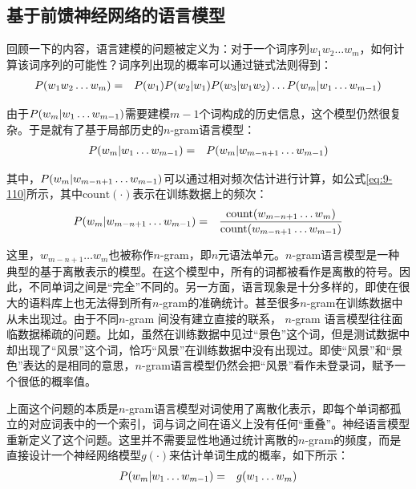 
\subsection{基于前馈神经网络的语言模型}

\parinterval  回顾一下{\chaptertwo}的内容，语言建模的问题被定义为：对于一个词序列$ w_1w_2\dots w_m$，如何计算该词序列的可能性？词序列出现的概率可以通过链式法则得到：
\begin{eqnarray}
{P}(w_1w_2\dots w_m)&=&{P}(w_1){P}(w_2|w_1){P}(w_3|w_1w_2)\dots {P}(w_m|w_1\dots w_{m-1})
\label{eq:9-57}
\end{eqnarray}

\parinterval  由于$ {P}(w_m|w_1\dots w_{m-1}) $需要建模$ m-1 $个词构成的历史信息，这个模型仍然很复杂。于是就有了基于局部历史的$n$-gram语言模型：
\begin{eqnarray}
{P}(w_m|w_1\dots w_{m-1})&=&{P}(w_m|w_{m-n+1}\dots w_{m-1})
\label{eq:9-58}
\end{eqnarray}

\noindent  其中，${P}(w_m|w_{m-n+1}\dots w_{m-1}) $可以通过相对频次估计进行计算，如公式\eqref{eq:9-110}所示，其中$ {\textrm{count}}(\cdot) $表示在训练数据上的频次：
\begin{eqnarray}
{P}(w_m|w_{m-n+1}\dots w_{m-1})&=&\frac{{\textrm{count}}(w_{m-n+1}\dots w_m)}{{\textrm{count}}(w_{m-n+1}\dots w_{m-1})}
\label{eq:9-110}
\end{eqnarray}

\noindent 这里，$ w_{m-n+1}\dots w_m $也被称作$n$-gram，即$ n $元语法单元。$n$-gram语言模型是一种典型的基于离散表示的模型。在这个模型中，所有的词都被看作是离散的符号。因此，不同单词之间是“完全”不同的。另一方面，语言现象是十分多样的，即使在很大的语料库上也无法得到所有$n$-gram的准确统计。甚至很多$n$-gram在训练数据中从未出现过。由于不同$n$-gram 间没有建立直接的联系， $n$-gram 语言模型往往面临数据稀疏的问题。比如，虽然在训练数据中见过“景色”这个词，但是测试数据中却出现了“风景”这个词，恰巧“风景”在训练数据中没有出现过。即使“风景”和“景色”表达的是相同的意思，$n$-gram语言模型仍然会把“风景”看作未登录词，赋予一个很低的概率值。

\parinterval  上面这个问题的本质是$n$-gram语言模型对词使用了离散化表示，即每个单词都孤立的对应词表中的一个索引，词与词之间在语义上没有任何“重叠”。神经语言模型重新定义了这个问题。这里并不需要显性地通过统计离散的$n$-gram的频度，而是直接设计一个神经网络模型$ g(\cdot)$来估计单词生成的概率，如下所示：
\begin{eqnarray}
{P}(w_m|w_1\dots w_{m-1})&=&g(w_1\dots w_m)
\label{eq:9-59}
\end{eqnarray}

